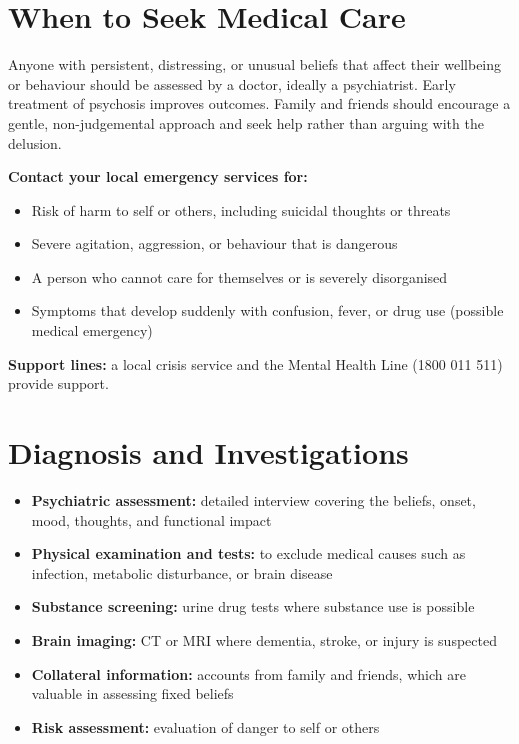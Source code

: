 \section*{When to Seek Medical Care}
Anyone with persistent, distressing, or unusual beliefs that affect their wellbeing or behaviour should be assessed by a doctor, ideally a psychiatrist. Early treatment of psychosis improves outcomes. Family and friends should encourage a gentle, non-judgemental approach and seek help rather than arguing with the delusion.

\textbf{Contact your local emergency services for:}
\begin{itemize}
    \item Risk of harm to self or others, including suicidal thoughts or threats
    \item Severe agitation, aggression, or behaviour that is dangerous
    \item A person who cannot care for themselves or is severely disorganised
    \item Symptoms that develop suddenly with confusion, fever, or drug use (possible medical emergency)
\end{itemize}
\textbf{Support lines:} a local crisis service and the Mental Health Line (1800 011 511) provide support.

\section*{Diagnosis and Investigations}
\begin{itemize}
    \item \textbf{Psychiatric assessment:} detailed interview covering the beliefs, onset, mood, thoughts, and functional impact
    \item \textbf{Physical examination and tests:} to exclude medical causes such as infection, metabolic disturbance, or brain disease
    \item \textbf{Substance screening:} urine drug tests where substance use is possible
    \item \textbf{Brain imaging:} CT or MRI where dementia, stroke, or injury is suspected
    \item \textbf{Collateral information:} accounts from family and friends, which are valuable in assessing fixed beliefs
    \item \textbf{Risk assessment:} evaluation of danger to self or others
\end{itemize}


